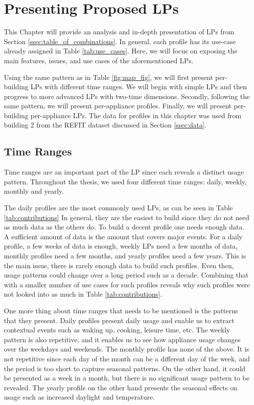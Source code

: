 \chapter{Presenting Proposed LPs}
\label{chapter4}

This Chapter will provide an analysis and in-depth presentation of LPs from Section \ref{ssec:table_of_combinations}.
In general, each profile has its use-case already assigned in Table \ref{tab:use_cases}.
Here, we will focus on exposing the main features, issues, and use cases of the aforementioned LPs. 

Using the same pattern as in Table \ref{fig:map_fig}, we will first present per-building LPs with different time ranges.
We will begin with simple LPs and then progress to more advanced LPs with two-time dimensions.
Secondly, following the same pattern, we will present per-appliance profiles.
Finally, we will present per-building per-appliance LPs.
The data for profiles in this chapter was used from building 2 from the REFIT dataset discussed in Section \ref{ssec:data}.
 
\section{Time Ranges}
\label{sec:time_range}

Time ranges are an important part of the LP since each reveals a distinct usage pattern.
Throughout the thesis, we used four different time ranges: daily, weekly, monthly and yearly.

The daily profiles are the most commonly used LPs, as can be seen in Table \ref{tab:contributions}
In general, they are the easiest to build since they do not need as much data as the others do.
To build a decent profile one needs enough data. 
A sufficient amount of data is the amount that covers major events.
For a daily profile, a few weeks of data is enough, weekly LPs need a few months of data, monthly profiles need a few months, and yearly profiles need a few years.
This is the main issue, there is rarely enough data to build such profiles.
Even then, usage patterns could change over a long period such as a decade.
Combining that with a smaller number of use cases for such profiles reveals why such profiles were not looked into as much in Table \ref{tab:contributions}.

One more thing about time ranges that needs to be mentioned is the patterns that they present.
Daily profiles present daily usage and enable us to extract contextual events such as waking up, cooking, leisure time, etc.
The weekly pattern is also repetitive, and it enables us to see how appliance usage changes over the weekdays and weekends.
The monthly profile has none of the above. It is not repetitive since each day of the month can be a different day of the week, and the period is too short to capture seasonal patterns.
On the other hand, it could be presented as a week in a month, but there is no significant usage pattern to be revealed.
The yearly profile on the other hand presents the seasonal effects on usage such as increased daylight and temperature. 

